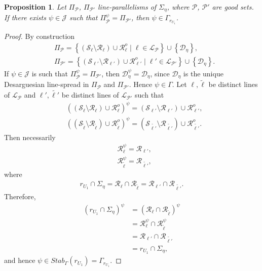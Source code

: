 \documentclass[11pt]{article}
\newtheorem{prop}[theorem]{Proposition}
\theoremstyle{definition}
\numberwithin{equation}{section}
\def\cJ{\mathcal J}
\def\cL{\mathcal L}
\def\cP{\mathcal P}
\def\cD{\mathcal D}
\def\cR{\mathcal R}
\def\cS{\mathcal S}
\begin{document}
\begin{prop}\label{automorphisms}
Let $\Pi_{\cP}$, $\Pi_{\cP'}$ line-parallelisms of $\Sigma_{\eta}$, where $\cP$, $\cP'$ are good sets. If there exists $ \psi \in \cJ$ such that $\Pi_{\cP}^\psi = \Pi_{\cP'}$, then $\psi \in \Gamma_{r_{U_1}}$. 
\end{prop}
\begin{proof}
By construction 
\begin{align*}
& \Pi_{\cP} = \left\{ \left(\cS_\ell \setminus \cR_{\ell}\right) \cup {\cR_{\ell}^o} \mid \ell \in \cL_{\cP} \right\} \cup \left\{\cD_{\eta}\right\}, \\
& \Pi_{\cP'} = \left\{ \left(\cS_{\ell'} \setminus \cR_{\ell'}\right) \cup {\cR_{\ell'}^o} \mid \ell' \in \cL_{\cP'} \right\} \cup \left\{\cD_{\eta}\right\}.
\end{align*}
If $\psi \in \cJ$ is such that $\Pi_{\cP}^\psi = \Pi_{\cP'}$, then $\cD_{\eta}^\psi = \cD_{\eta}$, since $\cD_{\eta}$ is the unique Desarguesian line-spread in $\Pi_{\cP}$ and $\Pi_{\cP'}$. Hence $\psi \in \Gamma$. Let $\ell, \tilde{\ell}$ be distinct lines of $\cL_{\cP}$ and $\ell', \tilde{\ell'}$ be distinct lines of $\cL_{\cP'}$ such that 
\begin{align*}
    & \left(\left(\cS_\ell \setminus \cR_{\ell}\right) \cup {\cR_{\ell}^o}\right)^\psi = \left(\cS_{\ell'} \setminus \cR_{\ell'}\right) \cup {\cR_{\ell'}^o}, \\
    & \left(\left(\cS_{\tilde{\ell}} \setminus \cR_{\tilde{\ell}}\right) \cup {\cR_{\tilde{\ell}}^o}\right)^\psi = \left(\cS_{\tilde{\ell'}} \setminus \cR_{\tilde{\ell'}}\right) \cup {\cR_{\tilde{\ell'}}^o}.
\end{align*}
Then necessarily 
\begin{align*}
    & \cR_{\ell}^\psi = \cR_{\ell'}, \\
    & \cR_{\tilde{\ell}}^\psi = \cR_{\tilde{\ell'}},
\end{align*}
where 
\begin{align*}
    r_{U_1} \cap \Sigma_{\eta} = \cR_{\ell} \cap \cR_{\tilde{\ell}} = \cR_{\ell'} \cap \cR_{\tilde{\ell'}}.
\end{align*}
Therefore, 
\begin{align*}
    \left(r_{U_1} \cap \Sigma_{\eta}\right)^\psi & = \left( \cR_{\ell} \cap \cR_{\tilde{\ell}} \right)^\psi \\
    & = \cR_{\ell}^\psi \cap \cR_{\tilde{\ell}}^\psi \\
    & = \cR_{\ell'} \cap \cR_{\tilde{\ell'}} \\
    & = r_{U_1} \cap \Sigma_{\eta},
\end{align*}
and hence $\psi \in Stab_{\Gamma}\left(r_{U_1}\right) = \Gamma_{r_{U_1}}$.
\end{proof}
\end{document}

